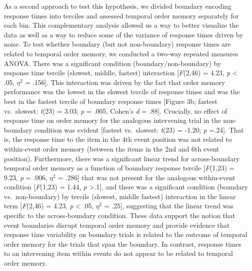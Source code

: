 As a second approach to test this hypothesis, we divided boundary
encoding response times into terciles and assessed temporal order memory
separately for each bin. This complementary analysis allowed us a way to
better visualize the data as well as a way to reduce some of the
variance of response times driven by noise. To test whether boundary
(but not non-boundary) response times are related to temporal order
memory, we conducted a two-way repeated measures ANOVA. There was a
significant condition (boundary/non-boundary) by response time tercile
(slowest, middle, fastest) interaction {[}\emph{F}(2,46) = 4.23,
\emph{p} \textless{} .05, \(\eta^{2}\) = .156{]}. This interaction was
driven by the fact that order memory performance was the lowest in the
slowest tercile of response times and was the best in the fastest
tercile of boundary response times {[}Figure 3b; fastest vs.~slowest:
\emph{t}(23) = 3.03; \emph{p} = .005, Cohen's \emph{d} = .88{]}.
Crucially, no effect of response time on order memory for the analogous
intervening trial in the non-boundary condition was evident {[}fastest
vs.~slowest: \emph{t}(23) = -1.20; \emph{p} =.24{]}. That is, the
response time to the item in the 4th event position was not related to
within-event order memory (between the items in the 2nd and 6th event
position). Furthermore, there was a significant linear trend for
across-boundary temporal order memory as a function of boundary response
tercile {[}\emph{F}(1,23) = 9.23, \emph{p} = .006, \(\eta^{2}\) =
.286{]} that was not present for the analogous within-event condition
{[}\emph{F}(1,23) = 1.44, \emph{p} \textgreater{}.1{]}, and there was a
significant condition (boundary vs.~non-boundary) by tercile (slowest,
middle fastest) interaction in the linear term {[}\emph{F}(2,46) = 4.23,
\emph{p} \textless{} .05, \(\eta^{2}\) = .25{]}, suggesting that the
linear trend was specific to the across-boundary condition. These data
support the notion that event boundaries disrupt temporal order memory
and provide evidence that response time variability on boundary trials
is related to the outcome of temporal order memory for the trials that
span the boundary. In contrast, response times to an intervening item
within events do not appear to be related to temporal order memory.

